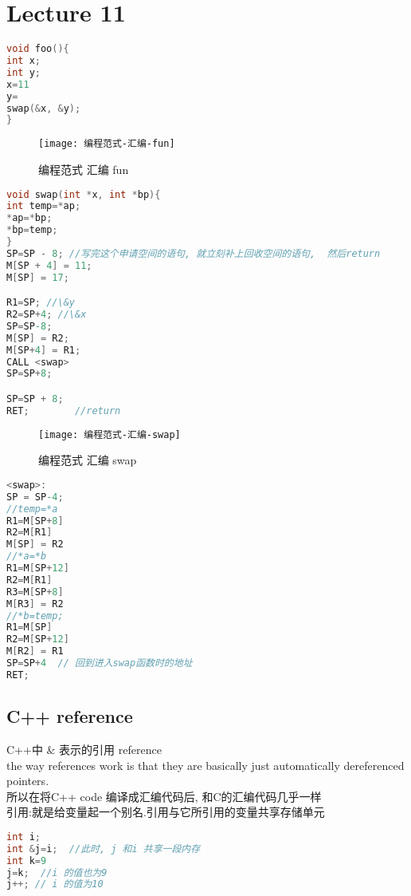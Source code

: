\documentclass{article}
\begin{document}
\section{Lecture 11}
\begin{lstlisting}[language = C]
void foo(){
int x;
int y;
x=11
y=
swap(&x, &y);
}
\end{lstlisting}
\begin{figure}[htbp]
	\centering
	\texttt{[image: 编程范式-汇编-fun]}\\
	\caption{编程范式 汇编 fun}\label{fig.编程范式.汇编.fun}
\end{figure}


\begin{lstlisting}[language = C]
void swap(int *x, int *bp){
int temp=*ap;
*ap=*bp;
*bp=temp;
}
SP=SP - 8; //写完这个申请空间的语句, 就立刻补上回收空间的语句,  然后return
M[SP + 4] = 11;
M[SP] = 17;

R1=SP; //\&y
R2=SP+4; //\&x
SP=SP-8;
M[SP] = R2;
M[SP+4] = R1;
CALL <swap>
SP=SP+8;

SP=SP + 8;
RET;		//return
\end{lstlisting}

\begin{figure}[htbp]
	\centering
	\texttt{[image: 编程范式-汇编-swap]}\\
	\caption{编程范式 汇编 swap}\label{fig.编程范式.汇编.swap}
\end{figure}

\begin{lstlisting}[language = C]
<swap>:
SP = SP-4;
//temp=*a
R1=M[SP+8]
R2=M[R1]
M[SP] = R2
//*a=*b
R1=M[SP+12]
R2=M[R1]
R3=M[SP+8]
M[R3] = R2
//*b=temp;
R1=M[SP]
R2=M[SP+12]
M[R2] = R1
SP=SP+4  // 回到进入swap函数时的地址
RET;
\end{lstlisting}

\subsection{C++ reference}
C++中 \& 表示的引用 reference\\
the way references work is that they are basically just automatically dereferenced pointers.\\
所以在将C++ code 编译成汇编代码后, 和C的汇编代码几乎一样\\

引用:就是给变量起一个别名.引用与它所引用的变量共享存储单元
\begin{lstlisting}[language = C]
int i;
int &j=i;  //此时, j 和i 共享一段内存
int k=9
j=k;  //i 的值也为9
j++; // i 的值为10
\end{lstlisting}
\end{document}
